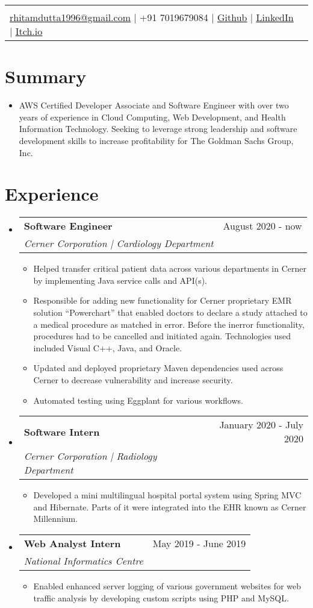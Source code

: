 \documentclass[letterpaper,11pt]{article}
\makeatletter
\newcommand{\sectionStart}{
  \begin{itemize}[label={},leftmargin=0in]
}
\newcommand{\sectionEnd}{
  \end{itemize}
}
\newcommand{\head}[7]{
  \noindent
  \begin{tabular*}{\textwidth}{l@{\extracolsep{\fill}}r}
    \centerline{
      \textbf{\href{#1}{\color{blue}{\LARGE {\underline{#2}}}}}
    }
    \vspace{5pt}\\
    \centerline{
      \href{mailto:#3}{\underline{#3}} $\mid$
      #4 $\mid$
       \href{#5}{\underline{Github}} $\mid$
       \href{#6}{\underline{LinkedIn}} $\mid$
       \href{#7}{\underline{Itch.io}}
    }
  \end{tabular*}
  \vspace{-10pt}
}
\newcommand{\summaryText}[1]{
  \item
  \begin{addmargin}[7pt]{0pt}
    {#1}
  \end{addmargin}
}
\newcommand{\jobHeading}[3]{
  \vspace{-1pt}
  \item
  \begin{tabular*}{1.0\textwidth}{l@{\extracolsep{\fill}}r@{}}
    \normalsize{\textbf{#1}} & #2 \\
    \textit{\small#3} \\
  \end{tabular*}\vspace{-5pt}
}
\newcommand{\listStart}{\begin{itemize}}
\newcommand{\listEnd}{\end{itemize}\vspace{-5pt}}
\newcommand{\bulletItem}[1]{
  \item
  \small{
    {#1 \vspace{-1.8pt}}
  }
}
\makeatother
\begin{document}
\head
  {https://rhitamdutta.com/portfolio/} %
  {Rhitam Dutta} %
  {rhitamdutta1996@gmail.com} %
  {+91 7019679084} %
  {https://github.com/exthazor} %
  {https://www.linkedin.com/in/rhitam-dutta} %
  {https://www.capt-entropy.itch.io} %


\section{Summary}
\sectionStart
  \summaryText
  {AWS Certified Developer Associate and Software Engineer with over two years of experience in Cloud Computing, Web Development, and Health Information Technology. Seeking to leverage strong leadership and software development skills to increase profitability for The Goldman Sachs Group, Inc.}
\sectionEnd

\section{Experience}
\sectionStart
  \jobHeading
    {Software Engineer}
    {August 2020 - now}
    {Cerner Corporation | Cardiology Department}
  \listStart
    \bulletItem
    {Helped transfer critical patient data across various departments in Cerner by implementing Java service calls and API(s).}
    \bulletItem
    {Responsible for adding new functionality for Cerner proprietary EMR solution “Powerchart” that enabled doctors to declare a study attached to a medical procedure as matched in error. Before the inerror functionality, procedures had to be cancelled and initiated again. Technologies used included Visual C++, Java, and Oracle. }
   \bulletItem
    {Updated and deployed proprietary Maven dependencies used across Cerner to decrease vulnerability and increase security.}
   \bulletItem
   {Automated testing using Eggplant for various workflows.}
   \listEnd
  \jobHeading
    {Software Intern} 
    {January 2020 - July 2020}
    {Cerner Corporation | Radiology Department}
  \listStart
    \bulletItem
    {Developed a mini multilingual hospital portal system using Spring MVC and Hibernate. Parts of it were integrated into the EHR known as Cerner Millennium.}
  \listEnd
  \jobHeading
    {Web Analyst Intern} 
    {May 2019 - June 2019}
    {National Informatics Centre}
  \listStart
    \bulletItem
    {Enabled enhanced server logging of various government websites for web traffic analysis by developing custom scripts using PHP and MySQL.}
  \listEnd
\sectionEnd

\end{document}

